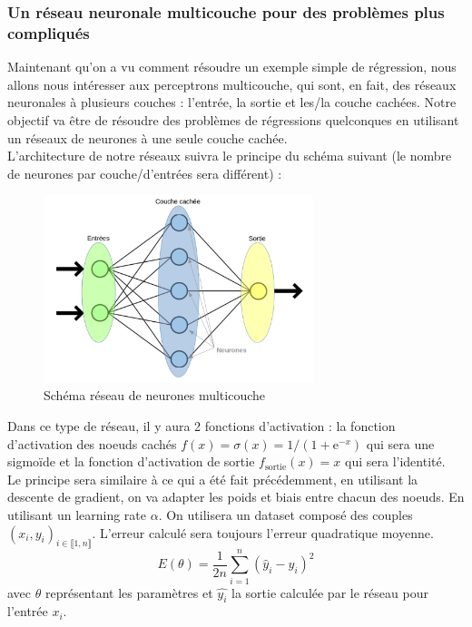         \subsubsection{Un réseau neuronale multicouche pour des problèmes plus compliqués}
        Maintenant qu'on a vu comment résoudre un exemple simple de régression, nous allons nous intéresser aux perceptrons multicouche, qui sont, en fait, des réseaux neuronales à plusieurs couches : l'entrée, la sortie et les/la couche cachées. Notre objectif va être de résoudre des problèmes de régressions quelconques en utilisant un réseaux de neurones à une seule couche cachée.\\
        L'architecture de notre réseaux suivra le principe du schéma suivant (le nombre de neurones par couche/d'entrées sera différent) : 
        \begin{figure}[H]
              \centering
                \includegraphics[width=0.7\textwidth]{images/rdn.png}
              \caption{Schéma réseau de neurones multicouche}
              \label{fig:rn4}
            \end{figure}
        Dans ce type de réseau, il y aura 2 fonctions d'activation : la fonction d'activation des noeuds cachés $f(x) = \sigma(x) = 1/(1+\text{e}^{-x})$ qui sera une sigmoïde et la fonction d'activation de sortie $f_{\text{sortie}}(x) = x$ qui sera l'identité.\\
        Le principe sera similaire à ce qui a été fait précédemment, en utilisant la descente de gradient, on va adapter les poids et biais entre chacun des noeuds. En utilisant un learning rate $\alpha$. On utilisera un dataset composé des couples $(x_i,y_i)_{i\in \llbracket1,n\rrbracket}$.
        L'erreur calculé sera toujours l'erreur quadratique moyenne.
        $$
        E(\theta) = \frac{1}{2n}\sum^n_{i=1}(\hat{y}_i-y_i)^2
        $$
        avec $\theta$ représentant les paramètres et $\hat{y_i}$ la sortie calculée par le réseau pour l'entrée $x_i$.
